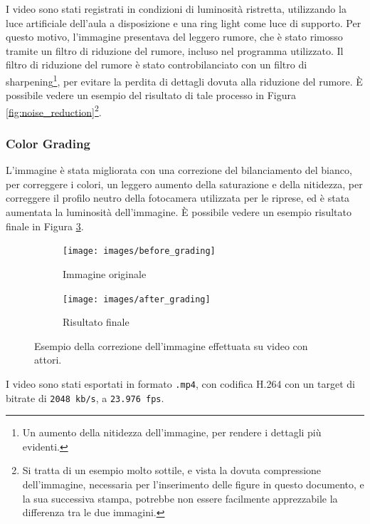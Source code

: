 I video sono stati registrati in condizioni di luminosità ristretta, utilizzando la luce artificiale dell'aula a disposizione e una ring light come luce di supporto. Per questo motivo, l'immagine presentava del leggero rumore, che è stato rimosso tramite un filtro di riduzione del rumore, incluso nel programma utilizzato. Il filtro di riduzione del rumore è stato controbilanciato con un filtro di sharpening\footnote{Un aumento della nitidezza dell'immagine, per rendere i dettagli più evidenti.}, per evitare la perdita di dettagli dovuta alla riduzione del rumore. È possibile vedere un esempio del risultato di tale processo in Figura \ref{fig:noise_reduction}\footnote{Si tratta di un esempio molto sottile, e vista la dovuta compressione dell'immagine, necessaria per l'inserimento delle figure in questo documento, e la sua successiva stampa, potrebbe non essere facilmente apprezzabile la differenza tra le due immagini.}.

\subsubsection{Color Grading}

L'immagine è stata migliorata con una correzione del bilanciamento del bianco, per correggere i colori, un leggero aumento della saturazione e della nitidezza, per correggere il profilo neutro della fotocamera utilizzata per le riprese, ed è stata aumentata la luminosità dell'immagine. È possibile vedere un esempio risultato finale in Figura \ref{fig:color_grading}.

\begin{figure}[t]
    \centering
    \begin{subfigure}{0.49\textwidth}
        \texttt{[image: images/before\_grading]} 
        \caption{Immagine originale}
        \label{fig:before_grading}
    \end{subfigure}
    \hfill
    \begin{subfigure}{0.49\textwidth}
        \texttt{[image: images/after\_grading]}
        \caption{Risultato finale}
        \label{fig:after_grading}
    \end{subfigure}
    \hfill
    \caption{Esempio della correzione dell'immagine effettuata su video con attori.}
    \label{fig:color_grading}
\end{figure}

I video sono stati esportati in formato \verb|.mp4|, con codifica H.264 con un target di bitrate di \verb|2048 kb/s|, a \verb|23.976 fps|.

